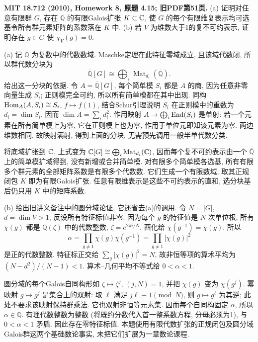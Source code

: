\begin{exercise}\label{hw:4.15}
\textbf{MIT 18.712 (2010), Homework 8, 原题 4.15; 旧PDF第51页.}
(a) 证明对任意有限群 $G$, 存在 $\mathbb Q$ 的有限Galois扩张 $K\subset\mathbb C$, 使 $G$ 的每个有限维复表示均可选基令所有群元素矩阵的系数落在 $K$ 中.
(b) 若 $V$ 为维数大于1的复不可约表示, 证明存在 $g\in G$ 使 $\chi_V(g)=0$.
\end{exercise}
\begin{solution}
(a) 记 $\overline{\mathbb Q}$ 为复数中的代数数域. Maschke定理在此特征零域成立, 且该域代数闭, 所以群代数分块为
\[
 \overline{\mathbb Q}[G]\cong\bigoplus_i\operatorname{Mat}_{d_i}(\overline{\mathbb Q}).
\]
给出这一分块的依据. 令 $A=\overline{\mathbb Q}[G]$, 每个简单模 $S_i$ 都是 $A$ 的商, 因为任意非零向量生成 $S_i$; 正则模完全可约, 所以所有简单模都在其中出现. 同构 $\operatorname{Hom}_A(A,S_i)\cong S_i$, $f\mapsto f(1)$, 结合Schur引理说明 $S_i$ 在正则模中的重数为 $d_i=\dim S_i$. 因而 $\dim A=\sum_i d_i^2$. 作用映射 $A\to\bigoplus_i\operatorname{End}(S_i)$ 是单射: 若一个元素在所有简单模上为零, 它在正则模上也为零, 作用于单位元即知该元素为零. 两边维数相同, 故映射满射, 得到上面的分块, 无需预先调用一般半单代数分类.

将底域扩张到 $\mathbb C$, 上式变为 $\mathbb C[G]\cong\bigoplus_i\operatorname{Mat}_{d_i}(\mathbb C)$, 因而每个复不可约表示由一个 $\overline{\mathbb Q}$ 上的简单模扩域得到, 没有新增或合并简单模. 对有限多个简单模各选基, 所有有限多个群元素的全部矩阵系数是有限多个代数数. 它们生成一个有限数域, 取其正规闭包 $K$ 即为有限Galois扩张. 任意有限维表示是这些不可约表示的直和, 选分块基后仍只用 $K$ 中的矩阵系数.

(b) 给出旧讲义备注中的圆分域论证, 它还省去(a)的调用. 令 $N=|G|$, $d=\dim V>1$, 反设所有特征标值非零. 因为每个 $g$ 的特征值是 $N$ 次单位根, 所有 $\chi(g)$ 都是 $\mathbb Q(\zeta)$ 中的代数整数, $\zeta=e^{2\pi i/N}$. 酉化给 $\chi(g^{-1})=\overline{\chi(g)}$. 所以
\[
 \alpha=\prod_{g\ne1}\chi(g)\chi(g^{-1})
       =\prod_{g\ne1}|\chi(g)|^2
\]
是正的代数整数. 特征标正交给 $\sum_g|\chi(g)|^2=N$, 故非恒等项的算术平均为 $(N-d^2)/(N-1)<1$. 算术--几何平均不等式给 $0<\alpha<1$.

圆分域的每个Galois自同构形如 $\zeta\mapsto\zeta^j$, $(j,N)=1$, 并把 $\chi(g)$ 变为 $\chi(g^j)$. 幂映射 $g\mapsto g^j$ 是集合上的双射: 取 $\ell$ 满足 $j\ell\equiv1\pmod N$, 则 $g\mapsto g^\ell$ 为其逆; 此处不要求该映射保持群乘法. 它也双射非恒等元素集. 因而每个自同构固定 $\alpha$, 所以 $\alpha\in\mathbb Q$. 有理代数整数为整数 (将既约分数代入首一整系数方程, 分母必须为1), 与 $0<\alpha<1$ 矛盾. 因此存在零特征标值. 本题使用有限代数扩张的正规闭包及圆分域Galois群这两个基础数论事实, 未把它们扩展为一章数论课程.
\end{solution}

